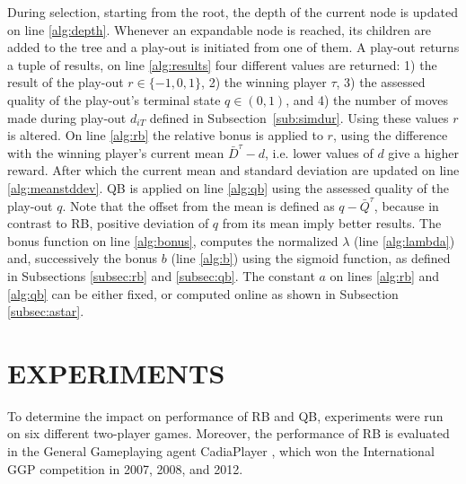\documentclass{ecai2014}
\begin{document}
During selection, starting from the root, the depth of the current node is updated on line \ref{alg:depth}. Whenever an expandable node is reached, its children are added to the tree and a play-out is initiated from one of them. A play-out returns a tuple of results, on line \ref{alg:results} four different values are returned: 1) the result of the play-out $r \in \{-1, 0, 1\}$, 2) the winning player $\tau$, 3) the assessed quality of the play-out's terminal state $q\in(0,1)$, and 4) the number of moves made during play-out $d_{iT}$ defined in Subsection~\ref{sub:simdur}. Using these values $r$ is altered. On line \ref{alg:rb} the relative bonus is applied to $r$, using the difference with the winning player's current mean $\bar{D}^\tau - d$, i.e. lower values of $d$ give a higher reward. After which the current mean and standard deviation are updated on line \ref{alg:meanstddev}. QB is applied on line \ref{alg:qb} using the assessed quality of the play-out $q$. Note that the offset from the mean is defined as $q - \bar{Q}^\tau$, because in contrast to RB, positive deviation of $q$ from its mean imply better results. The {\sc bonus} function on line \ref{alg:bonus}, computes the normalized $\lambda$ (line \ref{alg:lambda}) and, successively the bonus $b$ (line \ref{alg:b}) using the sigmoid function, as defined in Subsections \ref{subsec:rb} and \ref{subsec:qb}. The constant $a$ on lines \ref{alg:rb} and \ref{alg:qb} can be either fixed, or computed online as shown in Subsection \ref{subsec:astar}.

\section{EXPERIMENTS}
\label{sec:experiments}
To determine the impact on performance of RB and QB, experiments were run on six different two-player games. Moreover, the performance of RB is evaluated in the General Gameplaying agent {\sc CadiaPlayer} \cite{bjornsson2009cadiaplayer}, which won the International GGP competition in 2007, 2008, and 2012.
\end{document}
